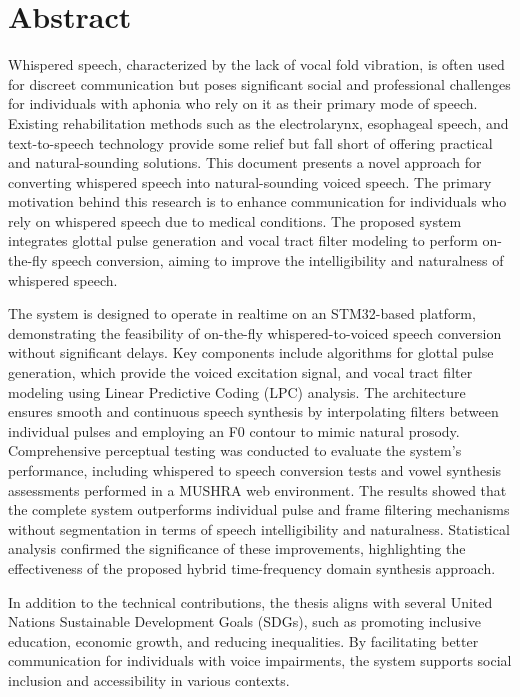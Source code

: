 \chapter*{Abstract}

Whispered speech, characterized by the lack of vocal fold vibration, is often used for discreet communication but poses significant social and professional challenges for individuals with aphonia who rely on it as their primary mode of speech. Existing rehabilitation methods such as the electrolarynx, esophageal speech, and text-to-speech technology provide some relief but fall short of offering practical and natural-sounding solutions. This document presents a novel approach for converting whispered speech into natural-sounding voiced speech. The primary motivation behind this research is to enhance communication for individuals who rely on whispered speech due to medical conditions. The proposed system integrates glottal pulse generation and vocal tract filter modeling to perform on-the-fly speech conversion, aiming to improve the intelligibility and naturalness of whispered speech.

The system is designed to operate in realtime on an STM32-based platform, demonstrating the feasibility of on-the-fly whispered-to-voiced speech conversion without significant delays. Key components include algorithms for glottal pulse generation, which provide the voiced excitation signal, and vocal tract filter modeling using Linear Predictive Coding (LPC) analysis. The architecture ensures smooth and continuous speech synthesis by interpolating filters between individual pulses and employing an F0 contour to mimic natural prosody. Comprehensive perceptual testing was conducted to evaluate the system's performance, including whispered to speech conversion tests and vowel synthesis assessments performed in a MUSHRA web environment. The results showed that the complete system outperforms individual pulse and frame filtering mechanisms without segmentation in terms of speech intelligibility and naturalness. Statistical analysis confirmed the significance of these improvements, highlighting the effectiveness of the proposed hybrid time-frequency domain synthesis approach.

In addition to the technical contributions, the thesis aligns with several United Nations Sustainable Development Goals (SDGs), such as promoting inclusive education, economic growth, and reducing inequalities. By facilitating better communication for individuals with voice impairments, the system supports social inclusion and accessibility in various contexts.


